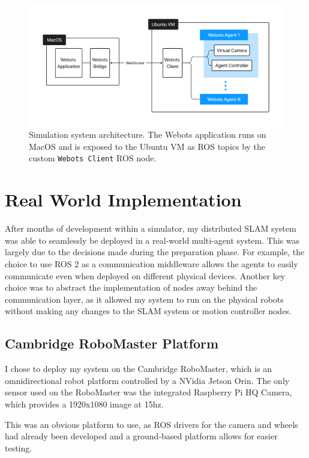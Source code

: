 \begin{figure}[h]
    \centering
    \includegraphics[trim=5cm 5cm 5cm 5cm, scale=0.2]{figures/simulation_environment.pdf}

    \caption{Simulation system architecture. The Webots application runs on MacOS and is exposed to the Ubuntu VM as ROS topics by the custom \texttt{Webots Client} ROS node.}
    \label{fig:simulation-environment}
\end{figure}

\section{Real World Implementation}
\label{sec:real-world-implementation}
After months of development within a simulator, my distributed SLAM system was able to seamlessly be deployed in a real-world multi-agent system. This was largely due to the decisions made during the preparation phase. For example, the choice to use ROS 2 as a communication middleware allows the agents to easily communicate even when deployed on different physical devices. Another key choice was to abstract the implementation of nodes away behind the communication layer, as it allowed my system to run on the physical robots without making any changes to the SLAM system or motion controller nodes.

\subsection{Cambridge RoboMaster Platform}
\label{sec:cambridge-robomaster-platform}
I chose to deploy my system on the Cambridge RoboMaster, which is an omnidirectional robot platform controlled by a NVidia Jetson Orin. The only sensor used on the RoboMaster was the integrated Raspberry Pi HQ Camera, which provides a 1920x1080 image at 15hz.

This was an obvious platform to use, as ROS drivers for the camera and wheels had already been developed and a ground-based platform allows for easier testing.

